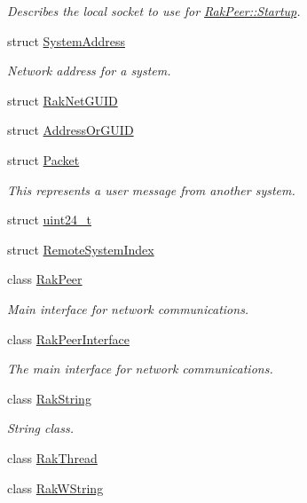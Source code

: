 \begin{DoxyCompactItemize}
\begin{DoxyCompactList}\small\item\em Describes the local socket to use for \hyperlink{class_rak_net_1_1_rak_peer_a92d493cb617381a6e750f7df6e768927}{Rak\-Peer\-::\-Startup}. \end{DoxyCompactList}\item 
struct \hyperlink{struct_rak_net_1_1_system_address}{System\-Address}
\begin{DoxyCompactList}\small\item\em Network address for a system. \end{DoxyCompactList}\item 
struct \hyperlink{struct_rak_net_1_1_rak_net_g_u_i_d}{Rak\-Net\-G\-U\-I\-D}
\item 
struct \hyperlink{struct_rak_net_1_1_address_or_g_u_i_d}{Address\-Or\-G\-U\-I\-D}
\item 
struct \hyperlink{struct_rak_net_1_1_packet}{Packet}
\begin{DoxyCompactList}\small\item\em This represents a user message from another system. \end{DoxyCompactList}\item 
struct \hyperlink{struct_rak_net_1_1uint24__t}{uint24\-\_\-t}
\item 
struct \hyperlink{struct_rak_net_1_1_remote_system_index}{Remote\-System\-Index}
\item 
class \hyperlink{class_rak_net_1_1_rak_peer}{Rak\-Peer}
\begin{DoxyCompactList}\small\item\em Main interface for network communications. \end{DoxyCompactList}\item 
class \hyperlink{class_rak_net_1_1_rak_peer_interface}{Rak\-Peer\-Interface}
\begin{DoxyCompactList}\small\item\em The main interface for network communications. \end{DoxyCompactList}\item 
class \hyperlink{class_rak_net_1_1_rak_string}{Rak\-String}
\begin{DoxyCompactList}\small\item\em String class. \end{DoxyCompactList}\item 
class \hyperlink{class_rak_net_1_1_rak_thread}{Rak\-Thread}
\item 
class \hyperlink{class_rak_net_1_1_rak_w_string}{Rak\-W\-String}

\end{DoxyCompactItemize}
